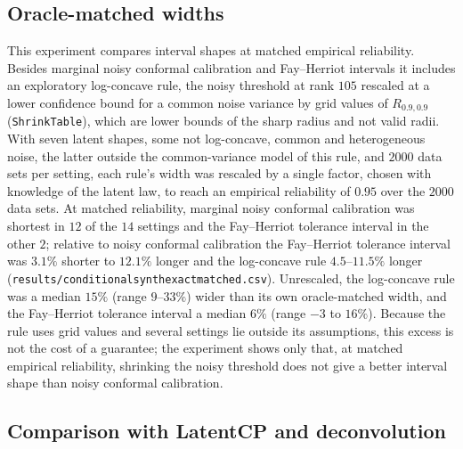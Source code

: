 \documentclass[11pt]{article}
\renewcommand{\_}{\usc\allowbreak}
\begin{document}
\subsection*{Oracle-matched widths}

This experiment compares interval shapes at matched empirical reliability. Besides marginal noisy conformal calibration and Fay--Herriot intervals it includes an exploratory log-concave rule, the noisy threshold at rank $105$ rescaled at a lower confidence bound for a common noise variance by grid values of $R_{0.9,0.9}$ (\texttt{ShrinkTable}), which are lower bounds of the sharp radius and not valid radii. With seven latent shapes, some not log-concave, common and heterogeneous noise, the latter outside the common-variance model of this rule, and $2000$ data sets per setting, each rule's width was rescaled by a single factor, chosen with knowledge of the latent law, to reach an empirical reliability of $0.95$ over the $2000$ data sets. At matched reliability, marginal noisy conformal calibration was shortest in $12$ of the $14$ settings and the Fay--Herriot tolerance interval in the other $2$; relative to noisy conformal calibration the Fay--Herriot tolerance interval was $3.1\%$ shorter to $12.1\%$ longer and the log-concave rule $4.5$--$11.5\%$ longer (\texttt{results/conditional\_synth\_exact\_matched.csv}). Unrescaled, the log-concave rule was a median $15\%$ (range $9$--$33\%$) wider than its own oracle-matched width, and the Fay--Herriot tolerance interval a median $6\%$ (range $-3$ to $16\%$). Because the rule uses grid values and several settings lie outside its assumptions, this excess is not the cost of a guarantee; the experiment shows only that, at matched empirical reliability, shrinking the noisy threshold does not give a better interval shape than noisy conformal calibration.

\subsection*{Comparison with LatentCP and deconvolution}
\end{document}

